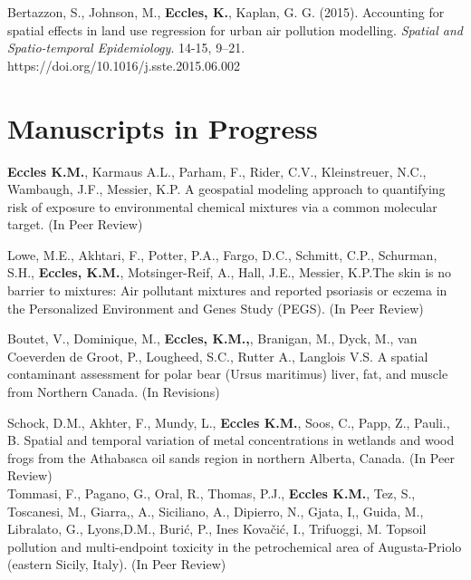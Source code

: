 \documentclass[margin,line]{res}
\begin{document}
\begin{resume}
Bertazzon, S., Johnson, M., \textbf{Eccles, K.}, Kaplan, G. G. (2015). Accounting for spatial effects in land use regression for urban air pollution modelling. \textit{Spatial and Spatio-temporal Epidemiology}. 14-15, 9–21. https://doi.org/10.1016/j.sste.2015.06.002

\section{\sc Manuscripts in Progress}

\textbf{Eccles K.M.}, Karmaus A.L., Parham, F., Rider, C.V., Kleinstreuer, N.C., Wambaugh, J.F., Messier, K.P. A geospatial modeling approach to quantifying risk of exposure to environmental chemical mixtures via a common molecular target. (In Peer Review)

Lowe, M.E., Akhtari, F., Potter, P.A., Fargo, D.C., Schmitt, C.P., Schurman, S.H., \textbf{Eccles, K.M.}, Motsinger-Reif, A., Hall, J.E., Messier, K.P.The skin is no barrier to mixtures: Air pollutant mixtures and reported psoriasis or eczema in the Personalized Environment and Genes Study (PEGS). (In Peer Review)

Boutet, V., Dominique, M., \textbf{Eccles, K.M.,}, Branigan, M., Dyck, M., van Coeverden de Groot, P., Lougheed, S.C., Rutter A., Langlois V.S. A spatial contaminant assessment for polar bear (Ursus maritimus) liver, fat, and muscle from Northern Canada. (In Revisions)

Schock, D.M., Akhter, F., Mundy, L., \textbf{Eccles K.M.}, Soos, C., Papp, Z., Pauli., B. Spatial and temporal variation of metal concentrations in wetlands and wood frogs from the Athabasca oil sands region in northern Alberta, Canada. (In Peer Review)\\

Tommasi, F., Pagano, G., Oral, R., Thomas, P.J., \textbf{Eccles K.M.}, Tez, S., Toscanesi, M., Giarra,, A., Siciliano, A., Dipierro, N., Gjata, I,, Guida, M., Libralato, G., Lyons,D.M., Burić, P., Ines Kovačić, I.,  Trifuoggi, M. Topsoil pollution and multi-endpoint toxicity in the petrochemical area of Augusta-Priolo (eastern Sicily, Italy). (In Peer Review)\\

\end{resume}
\end{document}
